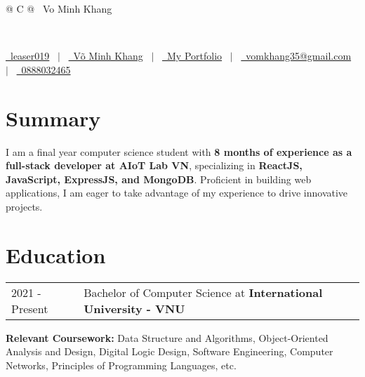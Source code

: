\documentclass[a4paper,11pt]{article}
\begin{document}
\pagestyle{empty} 

\begin{tabularx}{\linewidth}{@{} C @{}}
\Huge{\, Vo Minh Khang} \\[6.5pt]
    \begin{itemize}
     \\[5.5pt]   
    \end{itemize}
\href{https://github.com/leaser019}{\raisebox{-0.05\height}\faGithub\ leaser019} \ $|$ \ 
\href{https://www.linkedin.com/in/vominhkhang/}{\raisebox{-0.05\height}\faLinkedin\ Võ Minh Khang} \ $|$ \ 
\href{https://vominhkhang.vercel.app/}{\raisebox{-0.05\height}\faGlobe \ My Portfolio} \ $|$ \ 
\href{mailto:vomkhang35@gmail.com}{\raisebox{-0.05\height}\faEnvelope \ vomkhang35@gmail.com} \ $|$ \ 
\href{tel:0888032465}{\raisebox{-0.05\height}\faMobile \ 0888032465} \\
\end{tabularx}


\section{Summary}
I am a final year computer science student with \textbf{8 months of experience as a full-stack developer at AIoT Lab VN}, specializing in \textbf{ReactJS, JavaScript, ExpressJS, and MongoDB}. Proficient in building web applications, I am eager to take advantage of my experience to drive innovative projects.

\section{Education}
\begin{tabularx}{\linewidth}{@{}l X@{}}	
2021 - Present & \hfill \normalsize Bachelor of Computer Science at \textbf{International University - VNU} 
\end{tabularx}
\normalsize {\textbf{Relevant Coursework:} Data Structure and Algorithms, Object-Oriented Analysis and Design, Digital Logic Design, Software Engineering, Computer Networks, Principles of Programming Languages, etc.}
\end{document}
